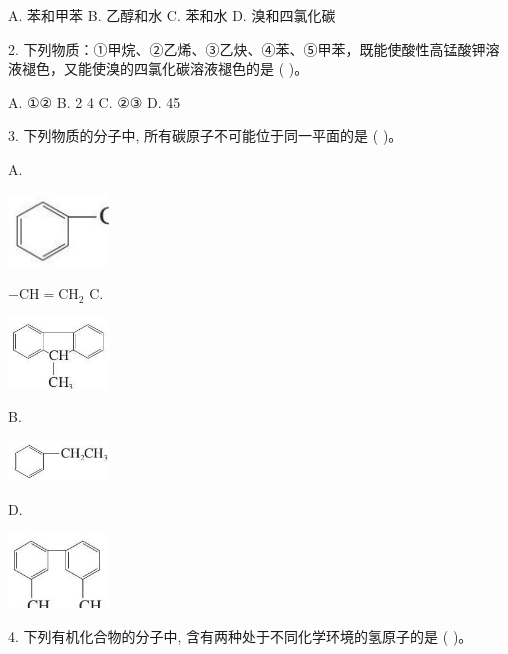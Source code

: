\documentclass[10pt]{article}
\begin{document}
A. 苯和甲苯 B. 乙醇和水 C. 苯和水 D. 溴和四氯化碳

2. 下列物质：①甲烷、②乙烯、③乙炔、④苯、⑤甲苯，既能使酸性高锰酸钾溶液褪色，又能使溴的四氯化碳溶液褪色的是 ( )。

A. ①② B. 2 4 C. ②③ D. 45

3. 下列物质的分子中, 所有碳原子不可能位于同一平面的是 ( )。

A.

\begin{center}
\includegraphics[max width=0.2\textwidth]{images/0190efc5-b58a-7c43-bfb0-e0a030df9cfd_56_114787.jpg}
\end{center}

\(- \mathrm{{CH}} = {\mathrm{{CH}}}_{2}\) C.

\begin{center}
\includegraphics[max width=0.2\textwidth]{images/0190efc5-b58a-7c43-bfb0-e0a030df9cfd_56_459013.jpg}
\end{center}

B.

\begin{center}
\includegraphics[max width=0.2\textwidth]{images/0190efc5-b58a-7c43-bfb0-e0a030df9cfd_56_723375.jpg}
\end{center}

D.

\begin{center}
\includegraphics[max width=0.2\textwidth]{images/0190efc5-b58a-7c43-bfb0-e0a030df9cfd_56_659369.jpg}
\end{center}

4. 下列有机化合物的分子中, 含有两种处于不同化学环境的氢原子的是 ( )。
\end{document}
